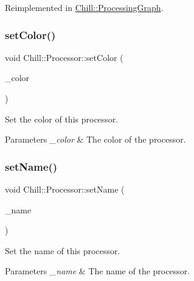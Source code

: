 Reimplemented in \mbox{\hyperlink{class_chill_1_1_processing_graph_a15ebc74e61a5bbdba8715c8d93b2815d}{Chill\+::\+Processing\+Graph}}.

\mbox{\label{class_chill_1_1_processor_ae0835b5fa85f9038911a72b2c293b7b3}} 
\subsubsection{\texorpdfstring{set\+Color()}{setColor()}}
{\footnotesize\ttfamily void Chill\+::\+Processor\+::set\+Color (\begin{DoxyParamCaption}\item[{const Im\+U32 \&}]{\+\_\+color }\end{DoxyParamCaption})\hspace{0.3cm}{\ttfamily [inline]}}

Set the color of this processor. 
\begin{DoxyParams}{Parameters}
{\em \+\_\+color} & The color of the processor. \\
\hline
\end{DoxyParams}
\mbox{\label{class_chill_1_1_processor_a1daa8b6fe879d65d96ca507a64a2adf0}} 
\subsubsection{\texorpdfstring{set\+Name()}{setName()}}
{\footnotesize\ttfamily void Chill\+::\+Processor\+::set\+Name (\begin{DoxyParamCaption}\item[{std\+::string}]{\+\_\+name }\end{DoxyParamCaption})\hspace{0.3cm}{\ttfamily [inline]}}

Set the name of this processor. 
\begin{DoxyParams}{Parameters}
{\em \+\_\+name} & The name of the processor. \\
\hline
\end{DoxyParams}
\mbox{\label{class_chill_1_1_processor_a295fa343c9c834d8c29f057aa0754d30}} 
